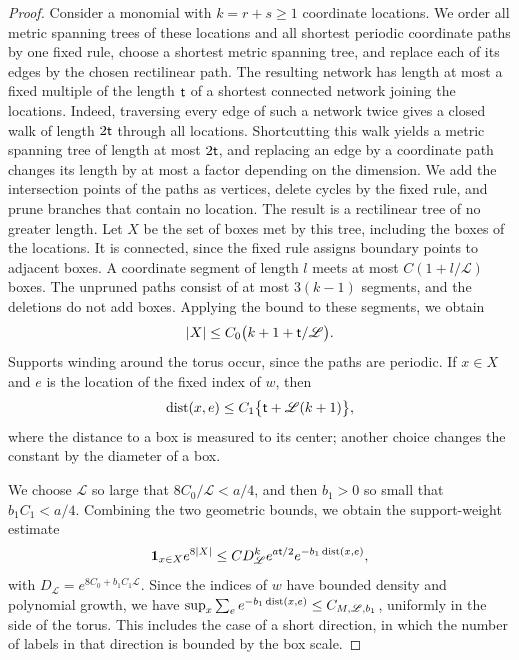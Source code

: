 \begin{proof}
Consider a monomial with $k=r+s\ge1$ coordinate locations. We order all metric spanning trees of these locations and all shortest periodic coordinate paths by one fixed rule, choose a shortest metric spanning tree, and replace each of its edges by the chosen rectilinear path. The resulting network has length at most a fixed multiple of the length $\mathsf t$ of a shortest connected network joining the locations. Indeed, traversing every edge of such a network twice gives a closed walk of length $2\mathsf t$ through all locations. Shortcutting this walk yields a metric spanning tree of length at most $2\mathsf t$, and replacing an edge by a coordinate path changes its length by at most a factor depending on the dimension. We add the intersection points of the paths as vertices, delete cycles by the fixed rule, and prune branches that contain no location. The result is a rectilinear tree of no greater length. Let $X$ be the set of boxes met by this tree, including the boxes of the locations. It is connected, since the fixed rule assigns boundary points to adjacent boxes. A coordinate segment of length $l$ meets at most $C(1+l/\mathscr L)$ boxes. The unpruned paths consist of at most $3(k-1)$ segments, and the deletions do not add boxes. Applying the bound to these segments, we obtain
\begin{equation}\label{ch09:eq:hull-size}
 \lvert X\rvert\le C_0\bigl(k+1+\mathsf t/\mathscr L\bigr).
\end{equation}
Supports winding around the torus occur, since the paths are periodic. If $x\in X$ and $e$ is the location of the fixed index of $w$, then
\[
 \operatorname{dist}(x,e)\le C_1\bigl\{\mathsf t+\mathscr L(k+1)\bigr\},
\]
where the distance to a box is measured to its center; another choice changes the constant by the diameter of a box.

We choose $\mathscr L$ so large that $8C_0/\mathscr L<a/4$, and then $b_1>0$ so small that $b_1C_1<a/4$. Combining the two geometric bounds, we obtain the support-weight estimate
\begin{equation}\label{ch09:eq:hull-payment}
 \mathbf 1_{x\in X}e^{8\lvert X\rvert}\le CD_{\mathscr L}^ke^{a\mathsf t/2}e^{-b_1\operatorname{dist}(x,e)},
\end{equation}
with $D_{\mathscr L}=e^{8C_0+b_1C_1\mathscr L}$. Since the indices of $w$ have bounded density and polynomial growth, we have $\sup_x\sum_ee^{-b_1\operatorname{dist}(x,e)}\le C_{M,\mathscr L,b_1}$, uniformly in the side of the torus. This includes the case of a short direction, in which the number of labels in that direction is bounded by the box scale.


\end{proof}
